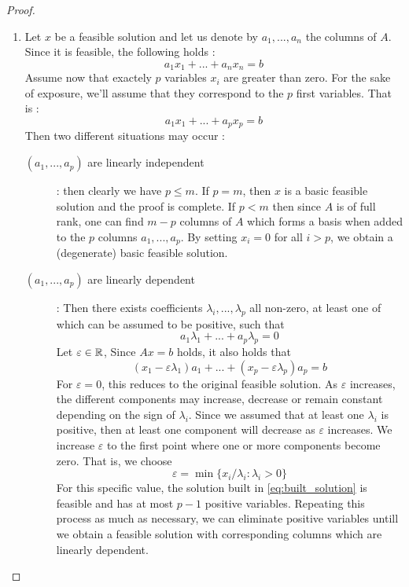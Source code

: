 \begin{proof}\leavevmode
    \begin{enumerate}[label=(\roman*)]
        \item Let $x$ be a feasible solution and let us denote by $a_1,...,a_n$ the columns of $A$. Since it is feasible, the following holds : \[ a_1x_1 + ... + a_nx_n = b \] Assume now that exactely $p$ variables $x_i$ are greater than zero. For the sake of exposure, we'll assume that they correspond to the $p$ first variables. That is : \[ a_1x_1 + ... + a_px_p = b \] Then two different situations may occur : 
        \begin{description}
            \item[$(a_1,...,a_p)$ are linearly independent] : then clearly we have $p\le m$. If $p=m$, then $x$ is a basic feasible solution and the proof is complete. If $p<m$ then since $A$ is of full rank, one can find $m-p$ columns of $A$ which forms a basis when added to the $p$ columns $a_1,...,a_p$. By setting $x_i = 0$ for all $i>p$, we obtain a (degenerate) basic feasible solution. 
            \item[$(a_1,...,a_p)$ are linearly dependent] :
            Then there exists coefficients $\lambda_i,...,\lambda_p$ all non-zero, at least one of which can be assumed to be positive, such that \[ a_1\lambda_1 + ... + a_p\lambda_p = 0 \] Let $\varepsilon\in\mathbb R$, Since $Ax = b$ holds, it also holds that \begin{equation} (x_1 - \varepsilon\lambda_1)a_1 + ... + (x_p-\varepsilon\lambda_p)a_p = b \label{eq:built_solution} \end{equation} For $\varepsilon = 0$, this reduces to the original feasible solution. As $\varepsilon$ increases, the different components may increase, decrease or remain constant depending on the sign of $\lambda_i$. Since we assumed that at least one $\lambda_i$ is positive, then at least one component will decrease as $\varepsilon$ increases. We increase $\varepsilon$ to the first point where one or more components become zero. That is, we choose \[ \varepsilon = \min\{ x_i/\lambda_i : \lambda_i > 0 \} \] For this specific value, the solution built in \ref{eq:built_solution} is feasible and has at most $p-1$ positive variables. Repeating this process as much as necessary, we can eliminate positive variables untill we obtain a feasible solution with corresponding columns which are linearly dependent. 
        \end{description}

\end{enumerate}
\end{proof}
